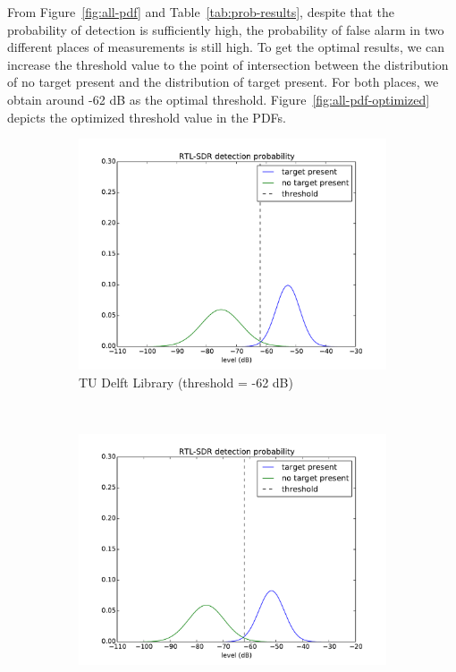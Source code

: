 From Figure~\ref{fig:all-pdf} and Table~\ref{tab:prob-results}, despite that the probability of detection is sufficiently high, the probability of false alarm in two different places of measurements is still high. To get the optimal results, we can increase the threshold value to the point of intersection between the distribution of no target present and the distribution of target present. For both places, we obtain around -62 dB as the optimal threshold. Figure~\ref{fig:all-pdf-optimized} depicts the optimized threshold value in the PDFs.

\begin{figure}[H]
    \centering
    \begin{subfigure}[b]{0.45\textwidth}
        \includegraphics[width=\textwidth]{figures/lib-optim-pdf}
        \caption{TU Delft Library (threshold = -62 dB)}
        \label{fig:lib-pdf-optim}
    \end{subfigure}
    ~ %
    \begin{subfigure}[b]{0.45\textwidth}
        \includegraphics[width=\textwidth]{figures/popta-optim-pdf}

\end{subfigure}
\end{figure}
